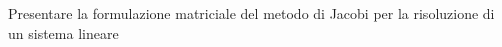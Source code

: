 Presentare la formulazione matriciale del metodo di Jacobi per la risoluzione di un sistema lineare 
